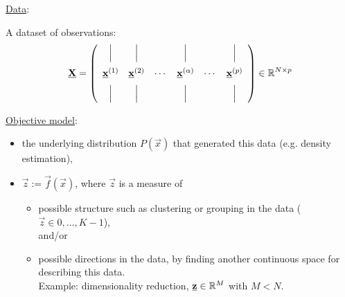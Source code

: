 \begin{frame}{\subsubsecname}

\underline{Data}:

A dataset of observations:
\begin{equation}
\label{eq:observations}
\underline{\mathbf{X}} = 
\left(
\begin{array}{cccccc}
\Big| & \Big| & & \Big| & & \Big| \\[3mm]
\underline{\mathbf{x}}^{(1)} & \underline{\mathbf{x}}^{(2)} & \cdots & \underline{\mathbf{x}}^{(\alpha)} & \cdots & \underline{\mathbf{x}}^{(p)}\\[2mm]
\Big| & \Big| & & \Big| & & \Big|
\end{array}
\right) \in \mathbb{R}^{N \times p}
\end{equation}
\end{frame}
\begin{frame}

\underline{Objective model}:
\begin{itemize}
\item the underlying distribution $P(\vec x)$ that generated this data (e.g. density estimation),
\item $\vec z := \vec f(\vec x)$, where $\vec z$ is a measure of 
\begin{itemize}
\item possible structure such as clustering or grouping in the data ($\vec z \in {0,\ldots,K-1}$), \\

and/or

\item possible directions in the data, by finding another continuous space for describing this data. \\

Example: dimensionality reduction, $\underline{\mathbf{z}} \in \mathbb{R}^M$ with $M < N$.

\end{itemize}
\end{itemize}

\end{frame}
